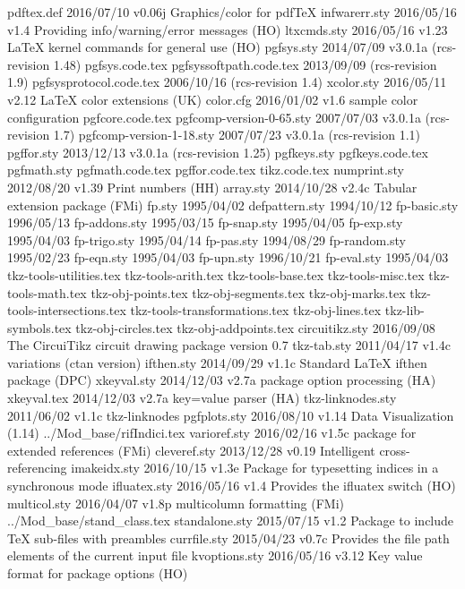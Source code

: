   pdftex.def    2016/07/10 v0.06j Graphics/color for pdfTeX
infwarerr.sty    2016/05/16 v1.4 Providing info/warning/error messages (HO)
 ltxcmds.sty    2016/05/16 v1.23 LaTeX kernel commands for general use (HO)
  pgfsys.sty    2014/07/09 v3.0.1a (rcs-revision 1.48)
  pgfsys.code.tex
pgfsyssoftpath.code.tex    2013/09/09  (rcs-revision 1.9)
pgfsysprotocol.code.tex    2006/10/16  (rcs-revision 1.4)
  xcolor.sty    2016/05/11 v2.12 LaTeX color extensions (UK)
   color.cfg    2016/01/02 v1.6 sample color configuration
 pgfcore.code.tex
pgfcomp-version-0-65.sty    2007/07/03 v3.0.1a (rcs-revision 1.7)
pgfcomp-version-1-18.sty    2007/07/23 v3.0.1a (rcs-revision 1.1)
  pgffor.sty    2013/12/13 v3.0.1a (rcs-revision 1.25)
 pgfkeys.sty    
 pgfkeys.code.tex
 pgfmath.sty    
 pgfmath.code.tex
  pgffor.code.tex
    tikz.code.tex
numprint.sty    2012/08/20 v1.39 Print numbers (HH)
   array.sty    2014/10/28 v2.4c Tabular extension package (FMi)
      fp.sty    1995/04/02
defpattern.sty    1994/10/12
fp-basic.sty    1996/05/13
fp-addons.sty    1995/03/15
 fp-snap.sty    1995/04/05
  fp-exp.sty    1995/04/03
fp-trigo.sty    1995/04/14
  fp-pas.sty    1994/08/29
fp-random.sty    1995/02/23
  fp-eqn.sty    1995/04/03
  fp-upn.sty    1996/10/21
 fp-eval.sty    1995/04/03
tkz-tools-utilities.tex
tkz-tools-arith.tex
tkz-tools-base.tex
tkz-tools-misc.tex
tkz-tools-math.tex
tkz-obj-points.tex
tkz-obj-segments.tex
tkz-obj-marks.tex
tkz-tools-intersections.tex
tkz-tools-transformations.tex
tkz-obj-lines.tex
tkz-lib-symbols.tex
tkz-obj-circles.tex
tkz-obj-addpoints.tex
circuitikz.sty    2016/09/08{} The CircuiTikz circuit drawing package version 0.7
 tkz-tab.sty    2011/04/17 v1.4c variations (ctan version) 
  ifthen.sty    2014/09/29 v1.1c Standard LaTeX ifthen package (DPC)
 xkeyval.sty    2014/12/03 v2.7a package option processing (HA)
 xkeyval.tex    2014/12/03 v2.7a key=value parser (HA)
tkz-linknodes.sty    2011/06/02 v1.1c tkz-linknodes
pgfplots.sty    2016/08/10 v1.14 Data Visualization (1.14)
../Mod_base/rifIndici.tex
varioref.sty    2016/02/16 v1.5c package for extended references (FMi)
cleveref.sty    2013/12/28 v0.19 Intelligent cross-referencing
imakeidx.sty    2016/10/15 v1.3e Package for typesetting indices in a synchronous mode
ifluatex.sty    2016/05/16 v1.4 Provides the ifluatex switch (HO)
multicol.sty    2016/04/07 v1.8p multicolumn formatting (FMi)
../Mod_base/stand_class.tex
standalone.sty    2015/07/15 v1.2 Package to include TeX sub-files with preambles
currfile.sty    2015/04/23 v0.7c Provides the file path elements of the current input file
kvoptions.sty    2016/05/16 v3.12 Key value format for package options (HO)
